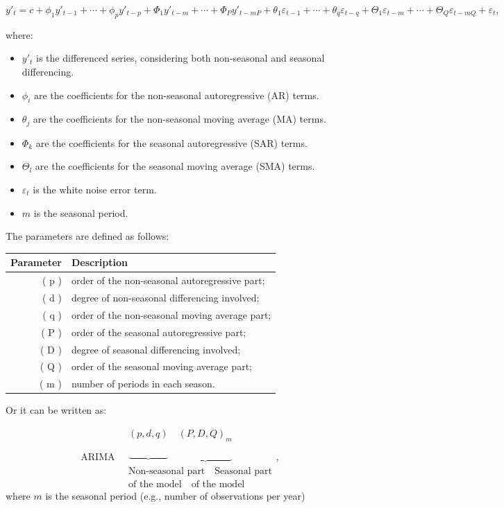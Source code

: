 \documentclass[
  11pt,
  a4paper,
]{article}
\providecommand{\tightlist}{%
  \setlength{\itemsep}{0pt}\setlength{\parskip}{0pt}}\usepackage{longtable,booktabs,array}
\begin{document}
\[
y'_t = c + \phi_1 y'_{t-1} + \cdots + \phi_p y'_{t-p} + \Phi_1 y'_{t-m} + \cdots + \Phi_P y'_{t-mP} + \theta_1 \varepsilon_{t-1} + \cdots + \theta_q \varepsilon_{t-q} + \Theta_1 \varepsilon_{t-m} + \cdots + \Theta_Q \varepsilon_{t-mQ} + \varepsilon_t,
\]

where:

\begin{itemize}
\tightlist
\item
  \(y'_t\) is the differenced series, considering both non-seasonal and
  seasonal differencing.
\item
  \(\phi_i\) are the coefficients for the non-seasonal autoregressive
  (AR) terms.
\item
  \(\theta_j\) are the coefficients for the non-seasonal moving average
  (MA) terms.
\item
  \(\Phi_k\) are the coefficients for the seasonal autoregressive (SAR)
  terms.
\item
  \(\Theta_l\) are the coefficients for the seasonal moving average
  (SMA) terms.
\item
  \(\varepsilon_t\) is the white noise error term.
\item
  \(m\) is the seasonal period.
\end{itemize}

The parameters are defined as follows:

\begin{longtable}[]{@{}rl@{}}
\toprule\noalign{}
Parameter & Description \\
\midrule\noalign{}
\endhead
\bottomrule\noalign{}
\endlastfoot
( p ) & order of the non-seasonal autoregressive part; \\
( d ) & degree of non-seasonal differencing involved; \\
( q ) & order of the non-seasonal moving average part; \\
( P ) & order of the seasonal autoregressive part; \\
( D ) & degree of seasonal differencing involved; \\
( Q ) & order of the seasonal moving average part; \\
( m ) & number of periods in each season. \\
\end{longtable}

Or it can be written as:

\[
\text{ARIMA} \quad 
\begin{array}{c}
(p, d, q) \quad (P, D, Q)_m \\
\underbrace{\phantom{(p, d, q)}} \quad \underbrace{\phantom{(P, D, Q)_m}} \\
\text{Non-seasonal part} \quad \text{Seasonal part} \\
\text{of the model} \quad \text{of the model}
\end{array},
\] where \(m\) is the seasonal period (e.g., number of observations per
year)
\end{document}
